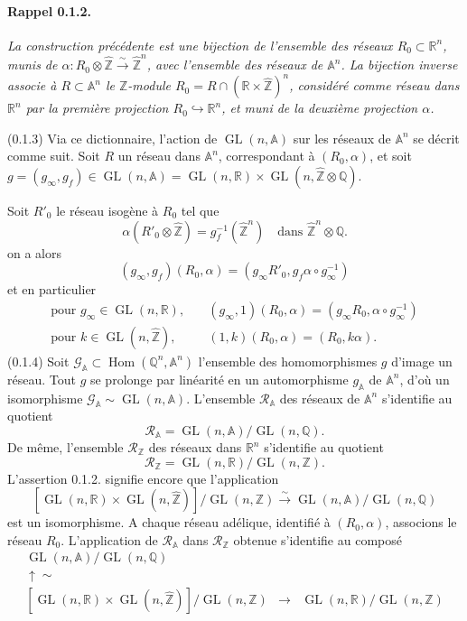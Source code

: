 \documentclass[10pt,a4paper]{article}
\providecommand{\GL}{\operatorname{GL}}
\providecommand{\Hom}{\operatorname{Hom}}
\providecommand{\R}{\mathbb R}
\providecommand{\Q}{\mathbb Q}
\providecommand{\Z}{\mathbb Z}
\providecommand{\A}{\mathbb A}
\providecommand{\calR}{\mathcal R}
\begin{document}
\paragraph{Rappel 0.1.2.}{\itshape  La construction précédente est une bijection de l'ensemble des réseaux $R_0\subset\R^n$, munis de $\alpha:R_0\otimes\widehat{\Z}\xrightarrow{\sim}\widehat{\Z}^{n}$, avec l'ensemble des réseaux de $\A^n$. La bijection inverse associe à $R\subset\A^n$ le $\Z$-module $R_0=R\cap(\R\times\widehat{\Z})^n$, considéré comme réseau dans $\R^n$ par la première projection $R_0\hookrightarrow\R^n$, et muni de la deuxième projection $\alpha$.\par}

\clearpage
{}
\hypertarget{authority-6}{}
(0.1.3) Via ce dictionnaire, l'action de $\GL(n,\A)$ sur les réseaux de $\A^n$ se décrit comme suit. Soit $R$ un réseau dans $\A^n$, correspondant à $(R_0,\alpha)$, et soit $g=(g_\infty,g_f)\in\GL(n,\A)=\GL(n,\R)\times\GL(n,\widehat{\Z}\otimes\Q)$.

Soit $R'_0$ le réseau isogène à $R_0$ tel que
\[
\alpha(R'_0\otimes\widehat{\Z})=g_f^{-1}(\widehat{\Z}^{n})\quad\text{dans }\widehat{\Z}^{n}\otimes\Q.
\]
on a alors
\[
(g_\infty,g_f)(R_0,\alpha)=(g_\infty R'_0,g_f\alpha\circ g_\infty^{-1})
\]
et en particulier
\[
\begin{aligned}
\text{pour }g_\infty\in\GL(n,\R),\quad &(g_\infty,1)(R_0,\alpha)=(g_\infty R_0,\alpha\circ g_\infty^{-1})\\
\text{pour }k\in\GL(n,\widehat{\Z}),\quad &(1,k)(R_0,\alpha)=(R_0,k\alpha).
\end{aligned}
\]
(0.1.4) Soit $\mathcal G_{\A}\subset\Hom(\Q^n,\A^n)$ l'ensemble des homomorphismes $g$ d'image un réseau. Tout $g$ se prolonge par linéarité en un automorphisme $g_{\A}$ de $\A^n$, d'où un isomorphisme $\mathcal G_{\A}\sim\GL(n,\A)$. L'ensemble $\calR_{\A}$ des réseaux de $\A^n$ s'identifie au quotient
\[
\calR_{\A}=\GL(n,\A)/\GL(n,\Q).
\]
De même, l'ensemble $\calR_{\Z}$ des réseaux dans $\R^n$ s'identifie au quotient
\[
\calR_{\Z}=\GL(n,\R)/\GL(n,\Z).
\]
L'assertion 0.1.2. signifie encore que l'application
\[
\tag{0.1.4.1}
[\GL(n,\R)\times\GL(n,\widehat{\Z})]/\GL(n,\Z)\xrightarrow{\sim}\GL(n,\A)/\GL(n,\Q)
\]
est un isomorphisme. A chaque réseau adélique, identifié à $(R_0,\alpha)$, associons le réseau $R_0$. L'application de $\calR_{\A}$ dans $\calR_{\Z}$ obtenue s'identifie au composé
\[
\begin{array}{ccc}
\GL(n,\A)/\GL(n,\Q)&&\\
\uparrow\scriptstyle\sim&&\\
{}[\GL(n,\R)\times\GL(n,\widehat{\Z})]/\GL(n,\Z)&\longrightarrow&\GL(n,\R)/\GL(n,\Z)
\end{array}
\]
\end{document}
